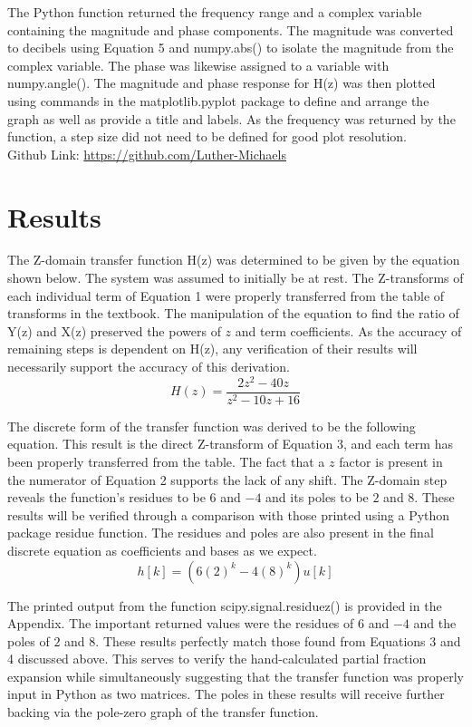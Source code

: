 \documentclass[12pt]{report}
\begin{document}
The Python function returned the frequency range and a complex variable containing the magnitude and phase components. The magnitude was converted to decibels using Equation 5 and numpy.abs() to isolate the magnitude from the complex variable. The phase was likewise assigned to a variable with numpy.angle(). The magnitude and phase response for H(z) was then plotted using commands in the matplotlib.pyplot package to define and arrange the graph as well as provide a title and labels. As the frequency was returned by the function, a step size did not need to be defined for good plot resolution. \\

Github Link: \url{https://github.com/Luther-Michaels} \\

\section{Results}

The Z-domain transfer function H(z) was determined to be given by the equation shown below. The system was assumed to initially be at rest. The Z-transforms of each individual term of Equation 1 were properly transferred from the table of transforms in the textbook. The manipulation of the equation to find the ratio of Y(z) and X(z) preserved the powers of $ z $ and term coefficients. As the accuracy of remaining steps is dependent on H(z), any verification of their results will necessarily support the accuracy of this derivation. 
\begin{equation*}
H(z) = \frac{2z^2 - 40z}{z^2 - 10z + 16}
\end{equation*}

The discrete form of the transfer function was derived to be the following equation. This result is the direct Z-transform of Equation 3, and each term has been properly transferred from the table. The fact that a $ z $ factor is present in the numerator of Equation 2 supports the lack of any shift. The Z-domain step reveals the function's residues to be $ 6 $ and $ -4 $ and its poles to be $ 2 $ and $ 8 $. These results will be verified through a comparison with those printed using a Python package residue function. The residues and poles are also present in the final discrete equation as coefficients and bases as we expect.
\begin{equation*}
	h[k] = (6(2)^k - 4(8)^k)u[k]
\end{equation*}

The printed output from the function scipy.signal.residuez() is provided in the Appendix. The important returned values were the residues of $ 6 $ and $ -4 $ and the poles of $ 2 $ and $ 8 $. These results perfectly match those found from Equations 3 and 4 discussed above. This serves to verify the hand-calculated partial fraction expansion while simultaneously suggesting that the transfer function was properly input in Python as two matrices. The poles in these results will receive further backing via the pole-zero graph of the transfer function. \\
\end{document}
